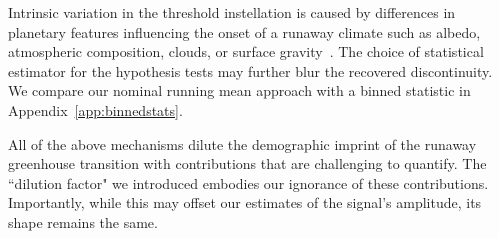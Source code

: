 \documentclass[twocolumn,twocolappendix]{aastex631}
\begin{document}
Intrinsic variation in the threshold instellation is caused by differences in planetary features influencing the onset of a runaway climate such as albedo, atmospheric composition, clouds, or surface gravity~\citep{Turbet2021,Pierrehumbert2022}.
The choice of statistical estimator for the hypothesis tests may further blur the recovered discontinuity.
We compare our nominal running mean approach with a binned statistic in Appendix~\ref{app:binnedstats}.

All of the above mechanisms dilute the demographic imprint of the runaway greenhouse transition with contributions that are challenging to quantify.
The ``dilution factor" we introduced embodies our ignorance of these contributions.
Importantly, while this may offset our estimates of the signal's amplitude, its shape remains the same.
\end{document}
